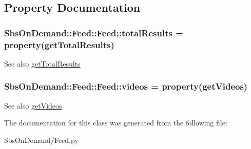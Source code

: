 \subsection{\-Property \-Documentation}
\hypertarget{class_sbs_on_demand_1_1_feed_1_1_feed_a4729512e6b96e31d080751d5ef28fc2d}{
\subsubsection[{total\-Results}]{\setlength{\rightskip}{0pt plus 5cm}\-Sbs\-On\-Demand\-::\-Feed\-::\-Feed\-::total\-Results = property(get\-Total\-Results)}}
\label{class_sbs_on_demand_1_1_feed_1_1_feed_a4729512e6b96e31d080751d5ef28fc2d}
\begin{DoxySeeAlso}{\-See also}
\hyperlink{class_sbs_on_demand_1_1_feed_1_1_feed_aedbf03d55460defe81bcab779d91e701}{get\-Total\-Results} 
\end{DoxySeeAlso}
\hypertarget{class_sbs_on_demand_1_1_feed_1_1_feed_a7cffcd6dbfb3458501f0fc7758788785}{
\subsubsection[{videos}]{\setlength{\rightskip}{0pt plus 5cm}\-Sbs\-On\-Demand\-::\-Feed\-::\-Feed\-::videos = property(get\-Videos)}}
\label{class_sbs_on_demand_1_1_feed_1_1_feed_a7cffcd6dbfb3458501f0fc7758788785}
\begin{DoxySeeAlso}{\-See also}
\hyperlink{class_sbs_on_demand_1_1_feed_1_1_feed_ae869544f2df4ca0c65693871554ef328}{get\-Videos} 
\end{DoxySeeAlso}


\-The documentation for this class was generated from the following file\-:\begin{DoxyCompactItemize}
\item 
\-Sbs\-On\-Demand/\-Feed.\-py\end{DoxyCompactItemize}
